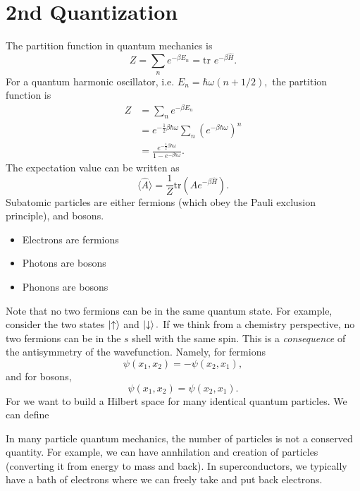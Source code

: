 \documentclass{article}
\numberwithin{equation}{section}
\begin{document}
\section{2nd Quantization}
The partition function in quantum mechanics is 
\begin{equation}
    Z = \sum_n e^{-\beta E_n} = \text{tr }e^{-\beta \hat{H}}.
\end{equation}
For a quantum harmonic oscillator, i.e. $E_n=\hbar \omega(n+1/2),$ the partition function is 
\begin{align}
    Z &= \sum_n e^{-\beta E_n} \\ 
    &= e^{-\frac{1}{2}\beta \hbar\omega}\sum_n \left(e^{-\beta \hbar \omega}\right)^n \\ 
    &= \boxed{\frac{e^{-\frac{1}{2}\beta \hbar\omega}}{1-e^{-\beta \hbar \omega}}}.
\end{align}
The expectation value can be written as 
\begin{equation}
    \langle \hat{A}\rangle  = \frac{1}{Z}\text{tr}\left(\hat{A}e^{-\beta \hat{H}}\right).
\end{equation}
Subatomic particles are either fermions (which obey the Pauli exclusion principle), and bosons.
\begin{itemize}
    \item Electrons are fermions
    \item Photons are bosons
    \item Phonons are bosons
\end{itemize}
Note that no two fermions can be in the same quantum state. For example, consider the two states $\ket{\uparrow}$ and $\ket{\downarrow}.$ If we think from a chemistry perspective, no two fermions can be in the $s$ shell with the same spin. This is a \textit{consequence} of the antisymmetry of the wavefunction. Namely, for fermions 
\begin{equation}
    \psi(x_1,x_2) = -\psi(x_2,x_1),
\end{equation}
and for bosons,
\begin{equation}
    \psi(x_1,x_2) = \psi(x_2,x_1).
\end{equation}
For  we want to build a Hilbert space for many identical quantum particles. We can define 
\begin{idea}
    In many particle quantum mechanics, the number of particles is not a conserved quantity. For example, we can have annhilation and creation of particles (converting it from energy to mass and back). In superconductors, we typically have a bath of electrons where we can freely take and put back electrons.
\end{idea}
\end{document}

